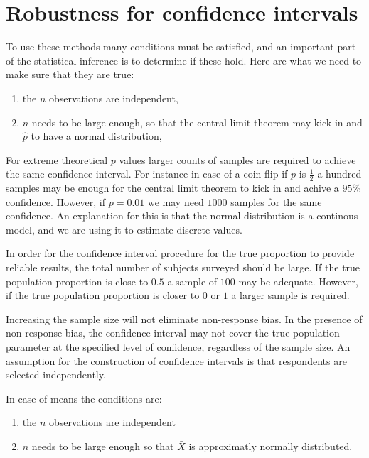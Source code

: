 \section{Robustness for confidence intervals}

To use these methods many conditions must be satisfied, and an important part of
the statistical inference is to determine if these hold. Here are what we need
to make sure that they are true:

\begin{enumerate}
  \item the $n$ observations are independent,
  \item $n$ needs to be large enough, so that the central limit theorem may kick
  in and $\hat{p}$ to have a normal distribution, 
\end{enumerate}

For extreme theoretical $p$ values larger counts of samples are required to
achieve the same confidence interval. For instance in case of a coin flip if $p$
is $\frac{1}{2}$ a hundred samples may be enough for the central limit theorem
to kick in and achive a $95\%$ confidence. However, if $p=0.01$ we may need
$1000$ samples for the same confidence. An explanation for this is that the
normal distribution is a continous model, and we are using it to estimate 
discrete values.

In order for the confidence interval procedure for the true proportion to
provide reliable results, the total number of subjects surveyed should be large.
If the true population proportion is close to $0.5$ a sample of $100$ may be
adequate. However, if the true population proportion is closer to $0$ or $1$ a
larger sample is required.

Increasing the sample size will not eliminate non-response bias. In the presence
of non-response bias, the confidence interval may not cover the true population
parameter at the specified level of confidence, regardless of the sample size.
An assumption for the construction of confidence intervals is that respondents
are selected independently.

In case of means the conditions are:

\begin{enumerate}
  \item the $n$ observations are independent
  \item $n$ needs to be large enough so that $\bar{X}$ is approximatly normally
  distributed.
\end{enumerate}

